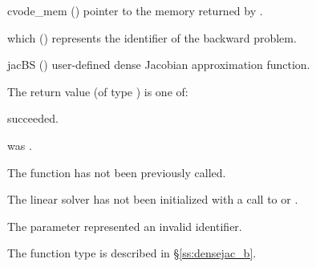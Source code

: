 {
  \begin{args}
  \item[cvode\_mem] ()
    pointer to the {\cvodes} memory returned by .
  \item[which] ()
    represents the identifier of the backward problem.
  \item[jacBS] ()
    user-defined dense Jacobian approximation function.
  \end{args}
}
{
  The return value  (of type ) is one of:
  \begin{args}
  \item[\Id{CVDLS\_SUCCESS}] 
     succeeded.
  \item[\Id{CVDLS\_MEM\_NULL}]
     was .
  \item[\Id{CVDLS\_NO\_ADJ}]
    The function  has not been previously called.
  \item[\Id{CVDLS\_LMEM\_NULL}]
    The linear solver has not been initialized with a call to 
    or .
  \item[\Id{CVDLS\_ILL\_INPUT}]
    The parameter  represented an invalid identifier.
  \end{args}
}
{
  The function type  is described in \S\ref{ss:densejac_b}.
}


